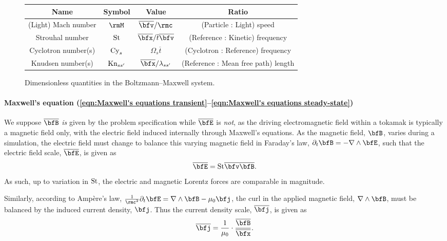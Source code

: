     \begin{figure}
        \centering
        \begin{tabular}{ c c c c }
            Name  &  Symbol  &  Value  &  Ratio  \\
            \hline\hline
            (Light) Mach number  &  $\rmM$  &  $\overline{\bfv}/\rmc$  &  (Particle : Light) speed  \\
            Strouhal number  &  $\mathrm{St}$  &  $\overline{\bfx}/\overline{t}\overline{\bfv}$  &  (Reference : Kinetic) frequency  \\
            Cyclotron number(s)  &  $\mathrm{Cy}_{s}$  &  $\Omega_{s}\overline{t}$  &  (Cyclotron : Reference) frequency  \\
            Knudsen number(s)  &  $\mathrm{Kn}_{ss'}$  &  $\overline{\bfx}/\lambda_{ss'}$  &  (Reference : Mean free path) length
        \end{tabular}
        \caption{Dimensionless quantities in the Boltzmann--Maxwell system.}
        \label{fig:kinetic dimensionless quantities}
    \end{figure} 

    \shortline

    \paragraph*{Maxwell's equation (\ref{eqn:Maxwell's equations transient}--\ref{eqn:Maxwell's equations steady-state})} We suppose $\overline{\bfB}$ \emph{is} given by the problem specification while $\overline{\bfE}$ is \emph{not}, as the driving electromagnetic field within a tokamak is typically a magnetic field only, with the electric field induced internally through Maxwell's equations. As the magnetic field, $\bfB$, varies during a simulation, the electric field must change to balance this varying magnetic field in Faraday's law, $\partial_{t}\bfB  =  - \nabla\wedge\bfE$, such that the electric field scale, $\overline{\bfE}$, is given as
    \begin{equation}
        \overline{\bfE}  =  \rmSt\overline{\bfv}\overline{\bfB}.
    \end{equation}
    As such, up to variation in $\mathrm{St}$, the electric and magnetic Lorentz forces are comparable in magnitude.

    Similarly, according to Ampère's law, $\frac{1}{\rmc^{2}}\partial_{t}\bfE  =  \nabla\wedge\bfB - \mu_{0}\bfj$, the curl in the applied magnetic field, $\nabla\wedge\bfB$, must be balanced by the induced current density, $\bfj$. Thus the current density scale, $\overline{\bfj}$, is given as
    \begin{equation}
        \overline{\bfj}  =  \frac{1}{\mu_{0}}\cdot\frac{\overline{\bfB}}{\overline{\bfx}}.
    \end{equation}

